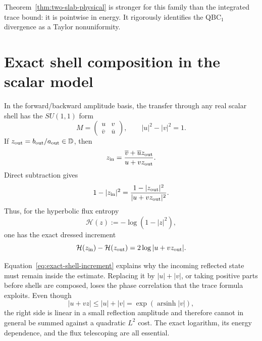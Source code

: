 \documentclass[11pt]{article}
\newcommand{\cH}{\mathcal H}
\DeclareMathOperator{\arsinh}{arsinh}
\theoremstyle{definition}
\begin{document}
Theorem~\ref{thm:two-slab-physical} is stronger for this family than the
integrated trace bound: it is pointwise in energy.  It rigorously identifies
the QBC$_1$ divergence as a Taylor nonuniformity.

\section{Exact shell composition in the scalar model}

In the forward/backward amplitude basis, the transfer through any real scalar
shell has the $SU(1,1)$ form
\begin{equation}
 M=\begin{pmatrix}u&v\\ \overline v&\overline u\end{pmatrix},
 \qquad |u|^2-|v|^2=1.
 \label{eq:su11}
\end{equation}
If $z_{\rm out}=b_{\rm out}/a_{\rm out}\in\mathbb D$, then
\begin{equation}
 z_{\rm in}
 =\frac{\overline v+\overline u z_{\rm out}}
 {u+v z_{\rm out}}.
 \label{eq:mobius}
\end{equation}
Direct subtraction gives
\begin{equation}
 1-|z_{\rm in}|^2
 =\frac{1-|z_{\rm out}|^2}{|u+v z_{\rm out}|^2}.
 \label{eq:disk-identity}
\end{equation}
Thus, for the hyperbolic flux entropy
\begin{equation}
 \cH(z):=-\log(1-|z|^2),
 \label{eq:hyperbolic-entropy}
\end{equation}
one has the exact dressed increment
\begin{equation}
 \cH(z_{\rm in})-\cH(z_{\rm out})
 =2\log|u+v z_{\rm out}|.
 \label{eq:exact-shell-increment}
\end{equation}

Equation~\eqref{eq:exact-shell-increment} explains why the incoming reflected
state must remain inside the estimate.  Replacing it by $|u|+|v|$, or taking
positive parts before shells are composed, loses the phase correlation that
the trace formula exploits.  Even though
\begin{equation}
 |u+vz|\leq |u|+|v|=\exp(\arsinh|v|),
 \label{eq:bad-majorant}
\end{equation}
the right side is linear in a small reflection amplitude and therefore cannot
in general be summed against a quadratic $L^2$ cost.  The exact logarithm, its
energy dependence, and the flux telescoping are all essential.
\end{document}
